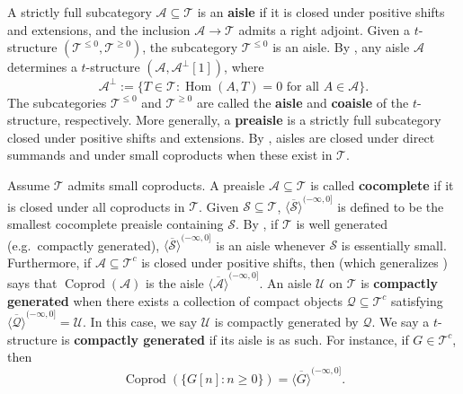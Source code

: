\documentclass[11pt]{amsart}
\theoremstyle{plain}
\theoremstyle{definition}
\numberwithin{equation}{section}
\numberwithin{theorem}{section}
\begin{document}
A strictly full subcategory $\mathcal{A} \subseteq \mathcal{T}$ is an \textbf{aisle} if it is closed under positive shifts and extensions, and the inclusion $\mathcal{A} \to \mathcal{T}$ admits a right adjoint. 
Given a $t$-structure $(\mathcal{T}^{\leq 0}, \mathcal{T}^{\geq 0})$, the subcategory $\mathcal{T}^{\leq 0}$ is an aisle. 
By \cite[\S 1, Proposition]{Keller/Vossieck:1988}, any aisle $\mathcal{A}$ determines a $t$-structure $(\mathcal{A}, \mathcal{A}^\perp[1])$, where
\begin{displaymath}
    \mathcal{A}^\perp := \{ T \in \mathcal{T} : \operatorname{Hom}(A,T) = 0 \text{ for all } A \in \mathcal{A} \}.
\end{displaymath}
The subcategories $\mathcal{T}^{\leq 0}$ and $\mathcal{T}^{\geq 0}$ are called the \textbf{aisle} and \textbf{coaisle} of the $t$-structure, respectively. 
More generally, a \textbf{preaisle} is a strictly full subcategory closed under positive shifts and extensions. 
By \cite[Lemma 1.3 \& Corollary 1.4]{AlonsoTarrio/Lopez/Salorio:2003}, aisles are closed under direct summands and under small coproducts when these exist in $\mathcal{T}$.

Assume $\mathcal{T}$ admits small coproducts. 
A preaisle $\mathcal{A} \subseteq \mathcal{T}$ is called \textbf{cocomplete} if it is closed under all coproducts in $\mathcal{T}$. 
Given $\mathcal{S}\subseteq \mathcal{T}$, $\overline{\langle \mathcal{S} \rangle}^{(-\infty, 0]}$ is defined to be the smallest cocomplete preaisle containing $\mathcal{S}$. 
By \cite[Theorem 2.3]{Neeman:2021b}, if $\mathcal{T}$ is well generated (e.g.\ compactly generated), $\overline{\langle \mathcal{S} \rangle}^{(-\infty, 0]}$ is an aisle whenever $\mathcal{S}$ is essentially small. 
Furthermore, if $\mathcal{A}\subseteq \mathcal{T}^c$ is closed under positive shifts, then \cite[Theorem 2.3.3 \& Remark 2.3.4]{Canonaco/Haesemeyer/Neeman/Stellari:2024} (which generalizes \cite[Theorem A.1 \& Proposition A.2]{AlonsoTarrio/Lopez/Salorio:2003}) says that $\operatorname{Coprod}(\mathcal{A})$ is the aisle $\overline{\langle \mathcal{A} \rangle}^{(-\infty, 0]}$. 
An aisle $\mathcal{U}$ on $\mathcal{T}$ is \textbf{compactly generated} when there exists a collection of compact objects $\mathcal{Q} \subseteq \mathcal{T}^c$ satisfying $\overline{\langle \mathcal{Q} \rangle}^{(-\infty, 0]} = \mathcal{U}$. 
In this case, we say $\mathcal{U}$ is compactly generated by $\mathcal{Q}$. 
We say a $t$-structure is \textbf{compactly generated} if its aisle is as such. 
For instance, if $G \in \mathcal{T}^c$, then 
\begin{displaymath}
    \operatorname{Coprod}( \{ G[n] : n\geq 0 \}) = \overline{\langle G \rangle}^{(-\infty, 0]} .
\end{displaymath}
\end{document}
